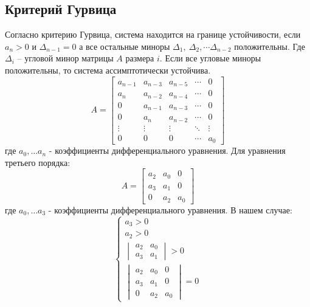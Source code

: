 \subsection{Критерий Гурвица}
Согласно критерию Гурвица, система находится на границе устойчивости, если $a_n > 0$ и $\Delta_{n - 1}=0$ а все
остальные миноры $\Delta_1,~\Delta_2,\cdots\Delta_{n-2}$ положительны.
Где $\Delta_i$ -- угловой минор матрицы $A$ размера $i$.  Если все угловые миноры положительны, то система
ассимптотически устойчива.
\begin{equation}
    A = \begin{bmatrix}
        a_{n-1} & a_{n-3} & a_{n-5} & \cdots & 0 \\
        a_n & a_{n-2} & a_{n-4} &\cdots & 0\\
        0 & a_{n-1} & a_{n-3} & \cdots & 0\\
        0 & a_n & a_{n-2} & \cdots & 0 \\
        \vdots & \vdots & \vdots & \ddots & \vdots \\
        0 & 0 & 0 & \cdots & a_0
    \end{bmatrix}
\end{equation}
где $a_0,\ldots a_n$ - коэффициенты дифференциального уравнения.
Для уравнения третьего порядка:
\begin{equation}
    A = \begin{bmatrix}
        a_2 & a_0 & 0 \\
        a_3 & a_1 & 0 \\
        0 & a_2 & a_0
    \end{bmatrix}
\end{equation}
где $a_0,\ldots a_3$ - коэффициенты дифференциального уравнения.
В нашем случае:
\begin{equation}
    \begin{cases}
        a_3 > 0 \\ 
        a_2 > 0 \\ 
        \begin{vmatrix}
            a_2 & a_0 \\
            a_3 & a_1
        \end{vmatrix} > 0 \\ 
        \begin{vmatrix}
            a_2 & a_0 & 0 \\
            a_3 & a_1 & 0 \\
            0 & a_2 & a_0
        \end{vmatrix} = 0
    \end{cases}
\end{equation}


